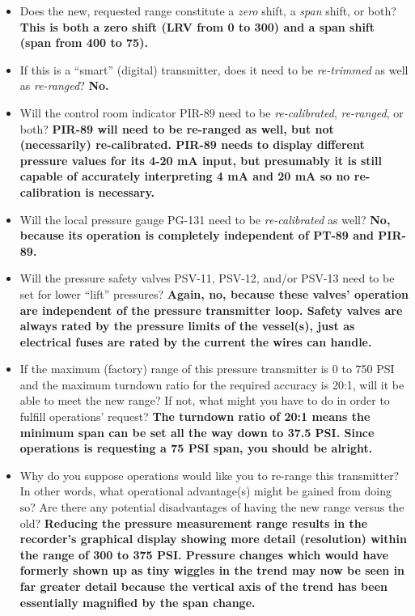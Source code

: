 












\begin{itemize}
\item{} Does the new, requested range constitute a {\it zero} shift, a {\it span} shift, or both?  {\bf This is both a zero shift (LRV from 0 to 300) and a span shift (span from 400 to 75).}
\vskip 10pt
\item{} If this is a ``smart'' (digital) transmitter, does it need to be {\it re-trimmed} as well as {\it re-ranged}?  {\bf No.}
\vskip 10pt
\item{} Will the control room indicator PIR-89 need to be {\it re-calibrated}, {\it re-ranged}, or both? {\bf PIR-89 will need to be re-ranged as well, but not (necessarily) re-calibrated.  PIR-89 needs to display different pressure values for its 4-20 mA input, but presumably it is still capable of accurately interpreting 4 mA and 20 mA so no re-calibration is necessary.}
\vskip 10pt
\item{} Will the local pressure gauge PG-131 need to be {\it re-calibrated} as well?  {\bf No, because its operation is completely independent of PT-89 and PIR-89.}
\vskip 10pt
\item{} Will the pressure safety valves PSV-11, PSV-12, and/or PSV-13 need to be set for lower ``lift'' pressures? {\bf Again, no, because these valves' operation are independent of the pressure transmitter loop.  Safety valves are always rated by the pressure limits of the vessel(s), just as electrical fuses are rated by the current the wires can handle.}
\vskip 10pt
\item{} If the maximum (factory) range of this pressure transmitter is 0 to 750 PSI and the maximum turndown ratio for the required accuracy is 20:1, will it be able to meet the new range?  If not, what might you have to do in order to fulfill operations' request? {\bf The turndown ratio of 20:1 means the minimum span can be set all the way down to 37.5 PSI.  Since operations is requesting a 75 PSI span, you should be alright.}
\vskip 10pt
\item{} Why do you suppose operations would like you to re-range this transmitter?  In other words, what operational advantage(s) might be gained from doing so?  Are there any potential disadvantages of having the new range versus the old? {\bf Reducing the pressure measurement range results in the recorder's graphical display showing more detail (resolution) within the range of 300 to 375 PSI.  Pressure changes which would have formerly shown up as tiny wiggles in the trend may now be seen in far greater detail because the vertical axis of the trend has been essentially magnified by the span change.}
\end{itemize}






